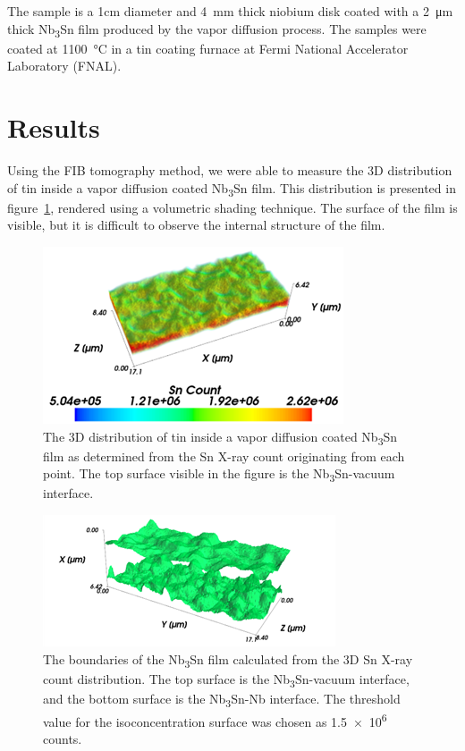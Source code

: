 The sample is a 1cm diameter and \qty{4}{\milli\meter} thick niobium disk coated with a \qty{2}{\micro\meter} thick Nb\textsubscript{3}Sn film produced by the vapor diffusion process\cite{pudasaini2019growth}. The samples were coated at \qty{1100}{\celsius} in a tin coating furnace at Fermi National Accelerator Laboratory (FNAL). 

\section{Results}

Using the FIB tomography method, we were able to measure the 3D distribution of tin inside a vapor diffusion coated Nb\textsubscript{3}Sn film. This distribution is presented in figure~\ref{fig:2}, rendered using a volumetric shading technique. The surface of the film is visible, but it is difficult to observe the internal structure of the film.
 
\begin{figure}[htb]%
    \centering%
    \includegraphics[width=0.5\columnwidth]{../figs/Figure-2.png}%
    \caption{The 3D distribution of tin inside a vapor diffusion coated Nb\textsubscript{3}Sn film as determined from the Sn X-ray count originating from each point. The top surface visible in the figure is the Nb\textsubscript{3}Sn-vacuum interface.}%
    \label{fig:2}%
\end{figure}

\begin{figure}[htb]%
    \centering%
    \includegraphics[width=0.5\columnwidth]{../figs/Figure-3.png}%
    \caption{The boundaries of the Nb\textsubscript{3}Sn film calculated from the 3D Sn X-ray count distribution. The top surface is the Nb\textsubscript{3}Sn-vacuum interface, and the bottom surface is the Nb\textsubscript{3}Sn-Nb interface. The threshold value for the isoconcentration surface was chosen as \num{1.5e6} counts.}%
    \label{fig:3}%
\end{figure}

